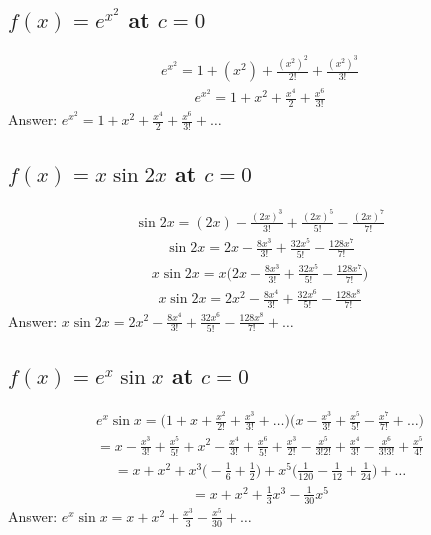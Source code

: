 \documentclass{article}
\begin{document}
\subsection{$f(x) = e^{x^2}$ at $c = 0$}
\begin{align*}
	e^{x^2} = 1 + (x^2) + \frac{(x^2)^2}{2!} + \frac{(x^2)^3}{3!}
\end{align*}
\begin{align*}
	e^{x^2} = 1 + x^2 + \frac{x^4}{2} + \frac{x^6}{3!}
\end{align*}
Answer: $e^{x^2} = 1 + x^2 + \frac{x^4}{2} + \frac{x^6}{3!} + \dots$

\subsection{$f(x) = x \sin{2x}$ at $c = 0$}
\begin{align*}
	\sin{2x} = (2x) - \frac{(2x)^3}{3!} + \frac{(2x)^5}{5!} - \frac{(2x)^7}{7!}
\end{align*}
\begin{align*}
	\sin{2x} = 2x - \frac{8x^3}{3!} + \frac{32x^5}{5!} - \frac{128x^7}{7!}
\end{align*}
\begin{align*}
	x\sin{2x} = x\bigg( 2x - \frac{8x^3}{3!} + \frac{32x^5}{5!} - \frac{128x^7}{7!} \bigg)
\end{align*}
\begin{align*}
	x \sin{2x} = 2x^2 - \frac{8x^4}{3!} + \frac{32x^6}{5!} - \frac{128x^8}{7!}
\end{align*}
Answer: $x \sin{2x} = 2x^2 - \frac{8x^4}{3!} + \frac{32x^6}{5!} - \frac{128x^8}{7!} + \dots$

\subsection{$f(x) = e^{x} \sin{x}$ at $c = 0$}
\begin{align*}
	e^x \sin{x} = \bigg( 1 + x + \frac{x^2}{2!} + \frac{x^3}{3!} + \dots \bigg) \bigg( x - \frac{x^3}{3!} + \frac{x^5}{5!} - \frac{x^7}{7!} + \dots \bigg)
\end{align*}
\begin{align*}
	= x - \frac{x^3}{3!} + \frac{x^5}{5!} + x^2 - \frac{x^4}{3!} + \frac{x^6}{5!} + \frac{x^3}{2!} - \frac{x^5}{3!2!} + \frac{x^4}{3!} -\frac{x^6}{3!3!} + \frac{x^5}{4!}
\end{align*}
\begin{align*}
	= x + x^2 + x^3 \bigg( -\frac{1}{6} + \frac{1}{2} \bigg) + x^5 \bigg( \frac{1}{120} - \frac{1}{12} + \frac{1}{24}\bigg) + \dots
\end{align*}
\begin{align*}
	= x + x^2 + \frac{1}{3}x^3 - \frac{1}{30}x^5
\end{align*}
Answer: $e^x \sin{x} = x + x^2 + \frac{x^3}{3} - \frac{x^5}{30} + \dots$
\end{document}
